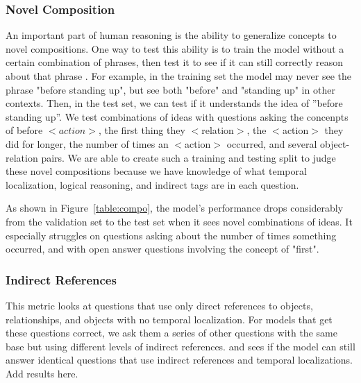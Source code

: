 \documentclass[10pt,twocolumn,letterpaper]{article}
\newcommand{\mgm}[1]{{\color{cyan}{mgm: #1}}}
\begin{document}
\subsubsection{Novel Composition}

An important part of human reasoning is the ability to generalize concepts to novel compositions. One way to test this ability  is to train the model without a certain combination of phrases, then test it to see if it can still correctly reason about that phrase \cite{lake2018generalization}. For example, in the training set the model may never see the phrase "before standing up", but see both "before" and "standing up" in other contexts. Then, in the test set, we can test if it understands the  idea  of  ”before standing up”. We test combinations of ideas with questions asking the concenpts of before $<action>$, the first thing they $<$relation$>$, the $<$action$>$ they did for longer, the number of times an $<$action$>$ occurred, and several object-relation pairs. We are able to create such a training and testing split to judge these novel  compositions  because  we  have  knowledge  of what temporal localization, logical reasoning, and indirect tags are in each question.

As shown in Figure~\ref{table:compo}, the model's performance drops considerably from the validation set to the test set when it sees novel combinations of ideas. It especially struggles on questions asking about the number of times something occurred, and with open answer questions involving the concept of "first". 

\subsubsection{Indirect References}

This metric looks at questions that use only direct references to objects, relationships, and objects with no temporal localization. For models that get these questions correct, we ask them a series of other questions with the same base but using different levels of indirect references. \mgm{If i do it, say that we only add in indirect references } and sees if the model can still answer identical questions that use indirect references and temporal localizations. Add results here.

\mgm{maybe look at if it can answer questions where the whole indirect reference is masked}

\mgm{This will only be interesting if we fix indirects not affecting accuracy.}
\end{document}
